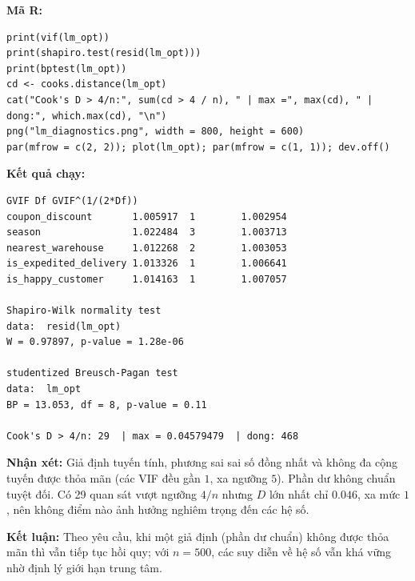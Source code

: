 \textbf{Mã R:}
\begin{lstlisting}
print(vif(lm_opt))                    
print(shapiro.test(resid(lm_opt)))
print(bptest(lm_opt))                 
cd <- cooks.distance(lm_opt)
cat("Cook's D > 4/n:", sum(cd > 4 / n), " | max =", max(cd), " | dong:", which.max(cd), "\n")
png("lm_diagnostics.png", width = 800, height = 600)
par(mfrow = c(2, 2)); plot(lm_opt); par(mfrow = c(1, 1)); dev.off()
\end{lstlisting}
\textbf{Kết quả chạy:}
\begin{lstlisting}[style=rout]
                          GVIF Df GVIF^(1/(2*Df))
coupon_discount       1.005917  1        1.002954
season                1.022484  3        1.003713
nearest_warehouse     1.012268  2        1.003053
is_expedited_delivery 1.013326  1        1.006641
is_happy_customer     1.014163  1        1.007057

Shapiro-Wilk normality test
data:  resid(lm_opt)
W = 0.97897, p-value = 1.28e-06

studentized Breusch-Pagan test
data:  lm_opt
BP = 13.053, df = 8, p-value = 0.11

Cook's D > 4/n: 29  | max = 0.04579479  | dong: 468 
\end{lstlisting}

\textbf{Nhận xét:} Giả định tuyến tính, phương sai sai số đồng nhất và không đa cộng tuyến được thỏa mãn (các VIF đều gần $1$, xa ngưỡng $5$). Phần dư không chuẩn tuyệt đối. Có 29 quan sát vượt ngưỡng $4/n$ nhưng $D$ lớn nhất chỉ $0.046$, xa mức $1$, nên không điểm nào ảnh hưởng nghiêm trọng đến các hệ số.

\textbf{Kết luận:} Theo yêu cầu, khi một giả định (phần dư chuẩn) không được thỏa mãn thì vẫn tiếp tục hồi quy; với $n = 500$, các suy diễn về hệ số vẫn khá vững nhờ định lý giới hạn trung tâm.

